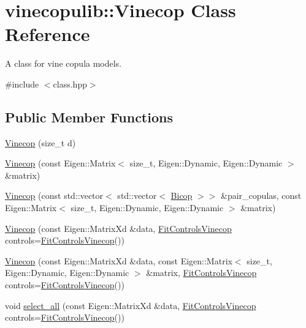 \hypertarget{classvinecopulib_1_1_vinecop}{}\section{vinecopulib\+:\+:Vinecop Class Reference}
\label{classvinecopulib_1_1_vinecop}


A class for vine copula models.  




{\ttfamily \#include $<$class.\+hpp$>$}

\subsection*{Public Member Functions}
\begin{DoxyCompactItemize}
\item 
\hyperlink{classvinecopulib_1_1_vinecop_a391541e2795d06a848d5a17fe3496a63}{Vinecop} (size\+\_\+t d)
\item 
\hyperlink{classvinecopulib_1_1_vinecop_ab44ab72bb062123dabe8c1a5c569f0c0}{Vinecop} (const Eigen\+::\+Matrix$<$ size\+\_\+t, Eigen\+::\+Dynamic, Eigen\+::\+Dynamic $>$ \&matrix)
\item 
\hyperlink{classvinecopulib_1_1_vinecop_a4e6f60c2ddb191f0fe083dda346d0dd1}{Vinecop} (const std\+::vector$<$ std\+::vector$<$ \hyperlink{classvinecopulib_1_1_bicop}{Bicop} $>$$>$ \&pair\+\_\+copulas, const Eigen\+::\+Matrix$<$ size\+\_\+t, Eigen\+::\+Dynamic, Eigen\+::\+Dynamic $>$ \&matrix)
\item 
\hyperlink{classvinecopulib_1_1_vinecop_a1bba8d207a21b5d0c76660af40383822}{Vinecop} (const Eigen\+::\+Matrix\+Xd \&data, \hyperlink{classvinecopulib_1_1_fit_controls_vinecop}{Fit\+Controls\+Vinecop} controls=\hyperlink{classvinecopulib_1_1_fit_controls_vinecop}{Fit\+Controls\+Vinecop}())
\item 
\hyperlink{classvinecopulib_1_1_vinecop_a4c97ed6f0af4e4cb726a26629ad73c6b}{Vinecop} (const Eigen\+::\+Matrix\+Xd \&data, const Eigen\+::\+Matrix$<$ size\+\_\+t, Eigen\+::\+Dynamic, Eigen\+::\+Dynamic $>$ \&matrix, \hyperlink{classvinecopulib_1_1_fit_controls_vinecop}{Fit\+Controls\+Vinecop} controls=\hyperlink{classvinecopulib_1_1_fit_controls_vinecop}{Fit\+Controls\+Vinecop}())
\item 
void \hyperlink{classvinecopulib_1_1_vinecop_ad6cbb6b69c41f13a6e5e46ece44c0f78}{select\+\_\+all} (const Eigen\+::\+Matrix\+Xd \&data, \hyperlink{classvinecopulib_1_1_fit_controls_vinecop}{Fit\+Controls\+Vinecop} controls=\hyperlink{classvinecopulib_1_1_fit_controls_vinecop}{Fit\+Controls\+Vinecop}())
$$
\end{DoxyCompactItemize}
